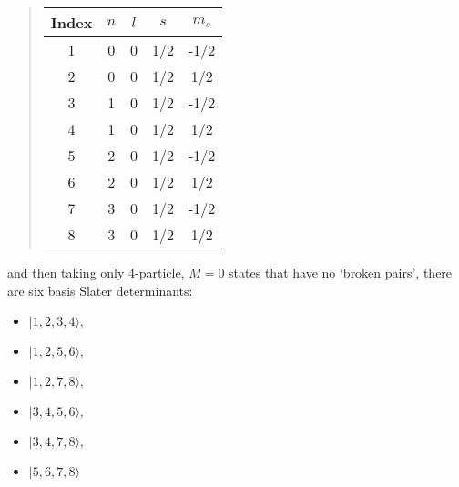 \documentclass[%
twoside,                 %
final,                   %
10pt]{article}
\begin{document}
\begin{quote}
\begin{tabular}{ccccc}
\hline
\multicolumn{1}{c}{ Index } & \multicolumn{1}{c}{ $n$ } & \multicolumn{1}{c}{ $l$ } & \multicolumn{1}{c}{ $s$ } & \multicolumn{1}{c}{ $m_s$ } \\
\hline
1     & 0   & 0   & 1/2 & -1/2  \\
2     & 0   & 0   & 1/2 & 1/2   \\
3     & 1   & 0   & 1/2 & -1/2  \\
4     & 1   & 0   & 1/2 & 1/2   \\
5     & 2   & 0   & 1/2 & -1/2  \\
6     & 2   & 0   & 1/2 & 1/2   \\
7     & 3   & 0   & 1/2 & -1/2  \\
8     & 3   & 0   & 1/2 & 1/2   \\
\hline
\end{tabular}
\end{quote}

\noindent
and then taking only 4-particle, $M=0$ states that have no `broken pairs', there are six basis Slater 
determinants:

\begin{itemize}
\item $|           1,           2 ,          3         ,       4  \rangle , $

\item $|            1      ,     2        ,        5         ,       6 \rangle , $

\item $|            1         ,       2     ,           7         ,       8  \rangle , $

\item $|            3        ,        4      ,          5          ,      6  \rangle , $

\item $|            3        ,        4      ,          7         ,       8  \rangle , $

\item $|            5        ,        6     ,           7     ,           8  \rangle $
\end{itemize}
\end{document}
